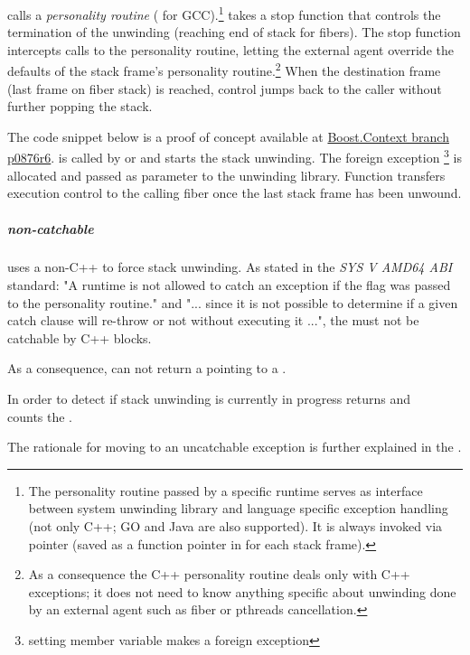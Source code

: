 \uwforced calls a \emph{personality routine} ( for GCC).\footnote{The
personality routine passed by a specific runtime serves as interface between system unwinding library
and language specific exception handling (not only C++; GO and Java are also supported). It is always invoked via pointer (saved
as a function pointer in \ehframe\xspace for each stack frame).}
\uwforced takes a stop function that controls the termination of the unwinding
(reaching end of stack for fibers).
The stop function intercepts calls to the personality routine, letting the external
agent override the defaults of the stack frame's personality routine.\footnote{As
a consequence the C++ personality routine deals only with C++ exceptions;
it does not need to know anything specific about unwinding done by an external
agent such as fiber or pthreads cancellation.}
When the destination frame (last frame on fiber
stack) is reached, control jumps back to the caller without further popping
the stack.

The code snippet below is a proof of concept available at \href{https://github.com/boostorg/context/tree/p0876r6}{Boost.Context branch p0876r6}.
 is called by \unwindfib or \dtor and starts the stack unwinding.
The foreign exception \footnote{setting member variable makes  a foreign exception}
is allocated and passed as parameter to the unwinding library. Function  transfers execution control
to the calling fiber once the last stack frame has been unwound.

\subparagraph{non-catchable \foreignex}
\unwindfib uses a non-C++ \foreignex to force stack unwinding.
As stated in the \emph{SYS V AMD64 ABI}\cite{SYSVAMD64} standard:
"A runtime is not allowed to catch an exception if the  flag was passed to the personality routine."
and "... since it is not possible to determine if a given catch clause will re-throw or not without executing it ...", the
\foreignex must not be catchable by C++  blocks.

As a consequence, \curex can not return a  pointing
to a \foreignex.

In order to detect if stack unwinding is currently in progress \uncex returns  and\\
\uncexs counts the \foreignex.

The rationale for moving to an uncatchable exception is further explained in
the .

